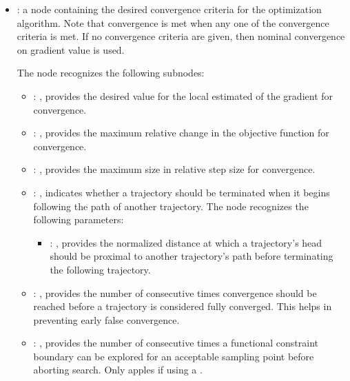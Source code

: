 \begin{itemize}
    \item {}:
      a node containing the desired convergence criteria for the optimization algorithm.
      Note that convergence is met when any one of the convergence criteria is met. If no
      convergence               criteria are given, then nominal convergence on gradient value is
      used.

      The  node recognizes the following subnodes:
      \begin{itemize}
        \item {}: ,
          provides the desired value for the local estimated of the gradient
          for convergence. 

        \item {}: ,
          provides the maximum relative change in the objective function for convergence.

        \item {}: ,
          provides the maximum size in relative step size for convergence.

        \item {}: ,
          indicates whether a trajectory should be terminated when it begins following the path
          of another trajectory.
          The  node recognizes the following parameters:
            \begin{itemize}
              \item {}: ,
                provides the normalized distance at which a trajectory's head should be proximal to
                another trajectory's path before terminating the following trajectory.
          \end{itemize}

        \item {}: ,
          provides the number of consecutive times convergence should be reached before a trajectory
          is considered fully converged. This helps in preventing early false convergence.

        \item {}: ,
          provides the number of consecutive times a functional constraint boundary can be explored
          for an acceptable sampling point before aborting search. Only apples if using a
          . 
      \end{itemize}


\end{itemize}
